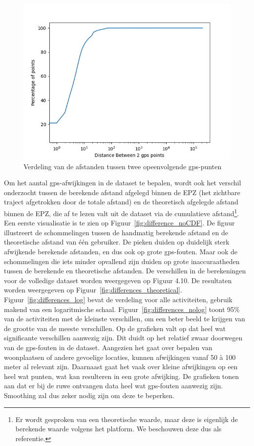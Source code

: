 \begin{figure}[h]
    \centering
    \includegraphics[width=\textwidth]{fig/Afwijkingen&Analyses/Graphs/Afstand tussen 2 gps-punten.png}
    \caption{Verdeling van de afstanden tussen twee opeenvolgende gps-punten}\label{fig:distance_between_gps_points_CDF}
\end{figure}

Om het aantal \ac{gps}-afwijkingen in de dataset te bepalen, wordt ook het
verschil onderzocht tussen de berekende afstand afgelegd binnen de \ac{EPZ}
(het zichtbare traject afgetrokken door de totale afstand) en de theoretisch
afgelegde afstand binnen de \ac{EPZ}, die af te lezen valt uit de dataset via
de cumulatieve afstand\footnote{Er wordt gesproken van een theoretische waarde,
    maar deze is eigenlijk de berekende waarde volgens het platform. We beschouwen
    deze dus als referentie.}. Een eerste visualisatie is te zien op
Figuur~\ref{fig:difference_noCDF}. De figuur illustreert de schommelingen
tussen de handmatig berekende afstand en de theoretische afstand van één
gebruiker. De pieken duiden op duidelijk sterk afwijkende berekende afstanden,
en dus ook op grote \ac{gps}-fouten. Maar ook de schommelingen die iets minder
opvallend zijn duiden op grote inaccuraatheden tussen de berekende en
theoretische afstanden. De verschillen in de berekeningen voor de volledige
dataset worden weergegeven op Figuur 4.10. De resultaten worden weergegeven op
Figuur~\ref{fig:differences_theoretical}. Figuur~\ref{fig:differences_log}
bevat de verdeling voor alle activiteiten, gebruik makend van een logaritmische
schaal. Figuur~\ref{fig:differences_nolog} toont 95\% van de activiteiten met
de kleinste verschillen, om een beter beeld te krijgen van de grootte van de
meeste verschillen. Op de grafieken valt op dat heel wat significante
verschillen aanwezig zijn. Dit duidt op het relatief zwaar doorwegen van de
\ac{gps}-fouten in de dataset. Aangezien het gaat over bepalen van woonplaatsen
of andere gevoelige locaties, kunnen afwijkingen vanaf 50 à 100 meter al
relevant zijn. Daarnaast gaat het vaak over kleine afwijkingen op een heel wat
punten, wat kan resulteren in een grote afwijking. De grafieken tonen aan dat
er bij de ruwe ontvangen data heel wat \ac{gps}-fouten aanwezig zijn. Smoothing
zal dus zeker nodig zijn om deze te beperken.

